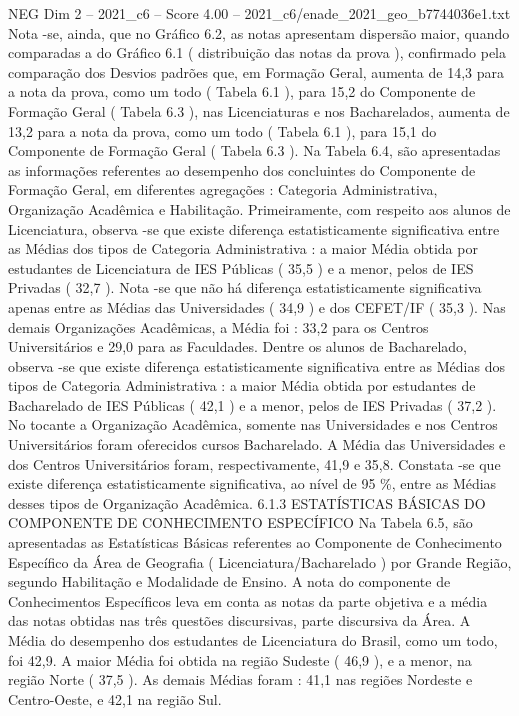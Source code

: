 \begin{textsample}{NEG Dim 2 – 2021\_c6 – Score 4.00 – 2021\_c6/enade\_2021\_geo\_b7744036e1.txt}
Nota -se, ainda, que no Gráfico 6.2, as notas apresentam dispersão maior, quando comparadas a do Gráfico 6.1 ( distribuição das notas da prova ), confirmado pela comparação dos Desvios padrões que, em Formação Geral, aumenta de 14,3 para a nota da prova, como um todo ( Tabela 6.1 ), para 15,2 do Componente de Formação Geral ( Tabela 6.3 ), nas Licenciaturas e nos Bacharelados, aumenta de 13,2 para a nota da prova, como um todo ( Tabela 6.1 ), para 15,1 do Componente de Formação Geral ( Tabela 6.3 ).
Na Tabela 6.4, são apresentadas as informações referentes ao desempenho dos concluintes do Componente de Formação Geral, em diferentes agregações : Categoria Administrativa, Organização Acadêmica e Habilitação.
Primeiramente, com respeito aos alunos de Licenciatura, observa -se que existe diferença estatisticamente significativa entre as Médias dos tipos de Categoria Administrativa : a maior Média obtida por estudantes de Licenciatura de IES Públicas ( 35,5 ) e a menor, pelos de IES Privadas ( 32,7 ).
Nota -se que não há diferença estatisticamente significativa apenas entre as Médias das Universidades ( 34,9 ) e dos CEFET/IF ( 35,3 ).
Nas demais Organizações Acadêmicas, a Média foi : 33,2 para os Centros Universitários e 29,0 para as Faculdades.
Dentre os alunos de Bacharelado, observa -se que existe diferença estatisticamente significativa entre as Médias dos tipos de Categoria Administrativa : a maior Média obtida por estudantes de Bacharelado de IES Públicas ( 42,1 ) e a menor, pelos de IES Privadas ( 37,2 ).
No tocante a Organização Acadêmica, somente nas Universidades e nos Centros Universitários foram oferecidos cursos Bacharelado.
A Média das Universidades e dos Centros Universitários foram, respectivamente, 41,9 e 35,8.
Constata -se que existe diferença estatisticamente significativa, ao nível de 95 \%, entre as Médias desses tipos de Organização Acadêmica. 6.1.3 ESTATÍSTICAS BÁSICAS DO COMPONENTE DE CONHECIMENTO ESPECÍFICO Na Tabela 6.5, são apresentadas as Estatísticas Básicas referentes ao Componente de Conhecimento Específico da Área de Geografia ( Licenciatura/Bacharelado ) por Grande Região, segundo Habilitação e Modalidade de Ensino.
A nota do componente de Conhecimentos Específicos leva em conta as notas da parte objetiva e a média das notas obtidas nas três questões discursivas, parte discursiva da Área.
A Média do desempenho dos estudantes de Licenciatura do Brasil, como um todo, foi 42,9.
A maior Média foi obtida na região Sudeste ( 46,9 ), e a menor, na região Norte ( 37,5 ).
As demais Médias foram : 41,1 nas regiões Nordeste e Centro-Oeste, e 42,1 na região Sul.

\end{textsample}
